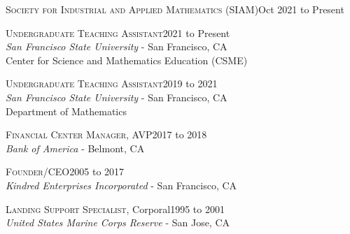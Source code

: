 \documentclass[hidelinks, 10pt]{article}
\begin{document}
{\begin{minipage}[ct]{0.9\linewidth}
\textsc{Society for Industrial and Applied Mathematics} (SIAM)\hfill Oct 2021 to Present\\
\end{minipage}

\vspace{6mm}

\hrulefill

\vspace{5mm}

\begin{minipage}[ct]{0.9\linewidth}
\textsc{Undergraduate Teaching Assistant}\hfill 2021 to Present\\
{\emph{San Francisco State University} - San Francisco, CA}\\
Center for Science and Mathematics Education (CSME)
\end{minipage}

\vspace{4mm}

\begin{minipage}[ct]{0.9\linewidth}
\textsc{Undergraduate Teaching Assistant}\hfill 2019 to 2021\\
{\emph{San Francisco State University} - San Francisco, CA}\\
Department of Mathematics
\end{minipage}

\vspace{2.5mm}

\begin{minipage}[ct]{0.9\linewidth}
\textsc{Financial Center Manager}, AVP\hfill 2017 to 2018\\
{\emph{Bank of America} - Belmont, CA}
\end{minipage}

\vspace{4mm}

\begin{minipage}[ct]{0.9\linewidth}
\textsc{Founder/CEO}\hfill 2005 to 2017\\
{\emph{Kindred Enterprises Incorporated} - San Francisco, CA}
\end{minipage}

\vspace{4mm}

\begin{minipage}[ct]{0.9\linewidth}
\textsc{Landing Support Specialist}, Corporal\hfill 1995 to 2001\\
{\emph{United States Marine Corps Reserve} - San Jose, CA}
\end{minipage}

}
\end{document}
